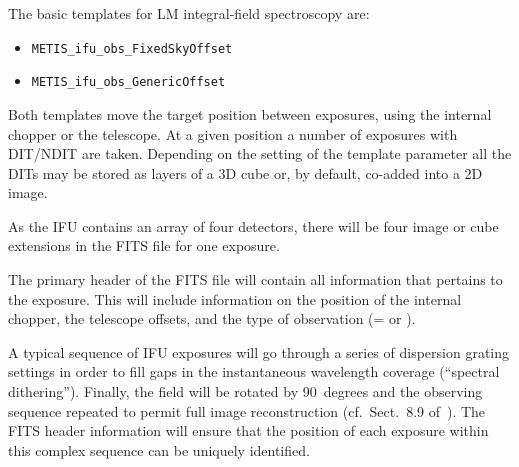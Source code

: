 The basic templates for LM integral-field spectroscopy are:
\begin{itemize}
\item \lstinline{METIS_ifu_obs_FixedSkyOffset}
\item \lstinline{METIS_ifu_obs_GenericOffset}
\end{itemize}
Both templates move the target position between exposures, using the
internal chopper or the telescope. At a given position a number of
exposures with DIT/NDIT are taken. Depending on the setting of the
template parameter  all the DITs may be stored as
layers of a 3D cube or, by default, co-added into a 2D image.

As the IFU contains an array of four detectors, there will be four
image or cube extensions in the FITS file for one exposure.

The primary header of the FITS file will contain all information that
pertains to the exposure. This will include information on the
position of the internal chopper, the telescope offsets, and the type
of observation (= or ).

A typical sequence of IFU exposures will go through a series of
dispersion grating settings in order to fill gaps in the instantaneous
wavelength coverage (``spectral dithering''). Finally, the field will be
rotated by 90~degrees and the observing sequence repeated to permit
full image reconstruction
(cf.~Sect.~8.9 of~\cite{DRLS}). The FITS header
information will ensure that the position of each exposure within this
complex sequence can be uniquely identified.

